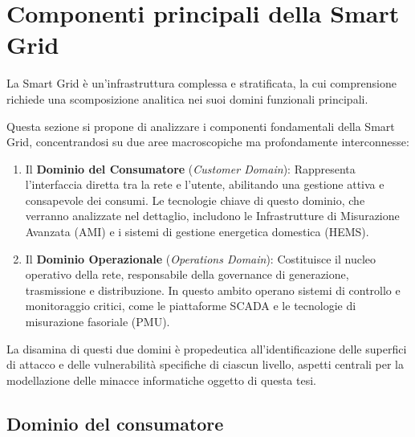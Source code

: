 
\section{Componenti principali della Smart Grid}

La Smart Grid è un'infrastruttura complessa e stratificata, la cui comprensione richiede una scomposizione analitica nei suoi domini funzionali principali. 


Questa sezione si propone di analizzare i componenti fondamentali della Smart Grid, concentrandosi su due aree macroscopiche ma profondamente interconnesse:

\begin{enumerate}
    \item Il \textbf{Dominio del Consumatore} (\textit{Customer Domain}): Rappresenta l'interfaccia diretta tra la rete e l'utente, abilitando una gestione attiva e consapevole dei consumi. Le tecnologie chiave di questo dominio, che verranno analizzate nel dettaglio, includono le Infrastrutture di Misurazione Avanzata (AMI) e i sistemi di gestione energetica domestica (HEMS).

    \item Il \textbf{Dominio Operazionale} (\textit{Operations Domain}): Costituisce il nucleo operativo della rete, responsabile della governance di generazione, trasmissione e distribuzione. In questo ambito operano sistemi di controllo e monitoraggio critici, come le piattaforme SCADA e le tecnologie di misurazione fasoriale (PMU).
\end{enumerate}


La disamina di questi due domini è propedeutica all'identificazione delle superfici di attacco e delle vulnerabilità specifiche di ciascun livello, aspetti centrali per la modellazione delle minacce informatiche oggetto di questa tesi.

\subsection{Dominio del consumatore}





